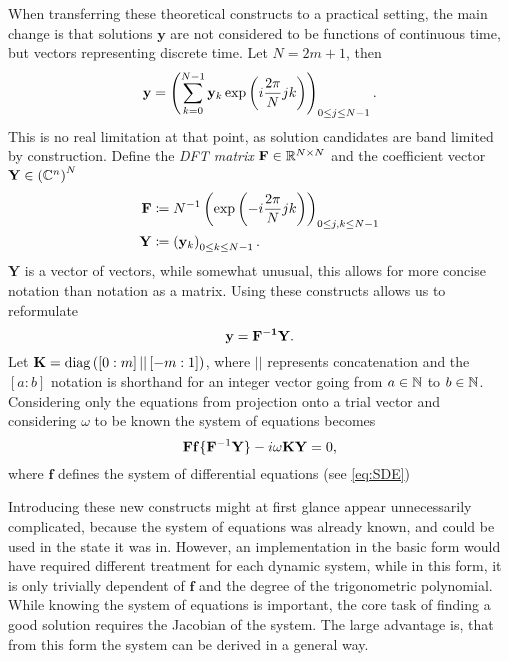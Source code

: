 When transferring these theoretical constructs to a practical setting, the main change is that solutions $\mathbf{y}$ are not considered to be functions of continuous time, but vectors representing discrete time.
Let $N = 2m+1$, then
	\[
		\mathbf{\mathbf{y}} = \left( \sum_{k=0}^{N-1} \mathbf{y}_k \exp\left(i \frac{2\pi}{N} j k\right) \right)_{0 \le j \le N-1} \text.
	\]
This is no real limitation at that point, as solution candidates are band limited by construction.
Define the \emph{DFT matrix} $\mathbf F \in \mathbb{R}^{N \times N}$ and the coefficient vector $\mathbf Y \in \left(\mathbb{C}^n\right)^N$
	\begin{align*}
		\mathbf{F} &\coloneqq N^{-1} \left( \exp\left(-i \frac{2\pi}{N} j k \right) \right)_{0 \le j,k \le N-1} \\
		\mathbf{Y} &\coloneqq \left(\mathbf{y}_k\right)_{0 \le k \le N-1} \text.
	\end{align*}
$\mathbf Y$ is a vector of vectors, while somewhat unusual, this allows for more concise notation than notation as a matrix.
Using these constructs allows us to reformulate
	\[
			\mathbf{y} = \mathbf{F^{-1}} \mathbf{Y} \text.
	\]
Let $\mathbf K = \operatorname{diag}\left( [0:m]\, ||\, [-m:1] \right)$, where $||$ represents concatenation and the $[a:b]$ notation is shorthand for an integer vector going from $a \in \mathbb{N}$ to $b \in \mathbb{N}$.
Considering only the equations from projection onto a trial vector and considering $\omega$ to be known the system of equations becomes %
	\[
		\mathbf{F} \mathbf{f}\{\mathbf F^{-1} \mathbf{Y}\} - i \omega \mathbf K \mathbf Y = 0\text,
	\]
where $\mathbf{f}$ defines the system of differential equations (see \autoref{eq:SDE})

Introducing these new constructs might at first glance appear unnecessarily complicated, because the system of equations was already known, and could be used in the state it was in.
However, an implementation in the basic form would have required different treatment for each dynamic system, while in this form, it is only trivially dependent of $\mathbf f$ and the degree of the trigonometric polynomial.
While knowing the system of equations is important, the core task of finding a good solution requires the Jacobian of the system.
The large advantage is, that from this form the system can be derived in a general way.

